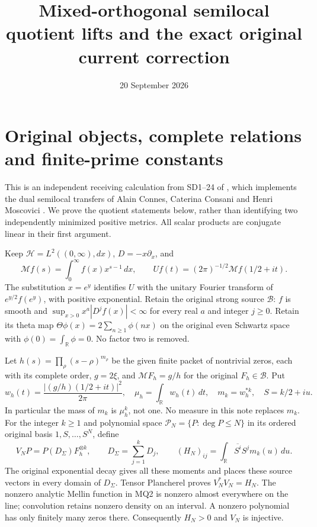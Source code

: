 \documentclass[11pt]{article}
\title{Mixed-orthogonal semilocal quotient lifts and the exact original current correction}
\author{}\date{20 September 2026}
\newcommand{\HH}{\mathcal H}
\newcommand{\M}{\mathcal M}
\newcommand{\B}{\mathscr B}
\begin{document}
\maketitle

\section{Original objects, complete relations and finite-prime constants}
This is an independent receiving calculation from SD1--24 of
\cite{SD}, which implements the dual semilocal transfers of Alain
Connes, Caterina Consani and Henri Moscovici \cite{CCM}. We prove the
quotient statements below, rather than identifying two independently
minimized positive metrics. All scalar products are conjugate linear
in their first argument.

Keep $\HH=L^2((0,\infty),dx)$, $D=-x\partial_x$, and
\[
 \M f(s)=\int_0^\infty f(x)x^{s-1}\,dx,
 \qquad Uf(t)=(2\pi)^{-1/2}\M f(1/2+it).                 \tag{MQ1}
\]
The substitution $x=e^y$ identifies $U$ with the unitary Fourier
transform of $e^{y/2}f(e^y)$, with positive exponential. Retain the
original strong source $\B$: $f$ is smooth and
$\sup_{x>0}x^a|D^jf(x)|<\infty$ for every real $a$ and integer
$j\ge0$. Retain its theta map
$\Theta\phi(x)=2\sum_{n\ge1}\phi(nx)$ on the original even Schwartz
space with $\phi(0)=\int_{\mathbb R}\phi=0$. No factor two is removed.

Let $h(s)=\prod_\rho(s-\rho)^{m_\rho}$ be the given finite packet
of nontrivial zeros, each with its complete order, $g=2\xi$, and
$\M F_h=g/h$ for the original $F_h\in\B$. Put
\[
 w_h(t)=\frac{|(g/h)(1/2+it)|^2}{2\pi},\quad
 \mu_h=\int_{\mathbb R}w_h(t)\,dt,\quad
 m_k=w_h^{*k},\quad S=k/2+iu.                              \tag{MQ2}
\]
In particular the mass of $m_k$ is $\mu_h^k$, not one. No measure
in this note replaces $m_k$. For the integer $k\ge1$ and polynomial
space $\mathcal P_N=\{P:\deg P\le N\}$ in its ordered original
basis $1,S,\ldots,S^N$, define
\[
 V_NP=P(D_\Sigma)F_h^{\otimes k},\qquad
 D_\Sigma=\sum_{j=1}^kD_j,\qquad
 (H_N)_{ij}=\int_{\mathbb R}\overline{S^i}S^j m_k(u)\,du.
                                                               \tag{MQ3}
\]
The original exponential decay gives all these moments and places
these source vectors in every domain of $D_\Sigma$. Tensor
Plancherel proves $V_N^*V_N=H_N$. The nonzero analytic Mellin
function in MQ2 is nonzero almost everywhere on the line;
convolution retains nonzero density on an interval. A nonzero
polynomial has only finitely many zeros there. Consequently
$H_N>0$ and $V_N$ is injective.
\end{document}
